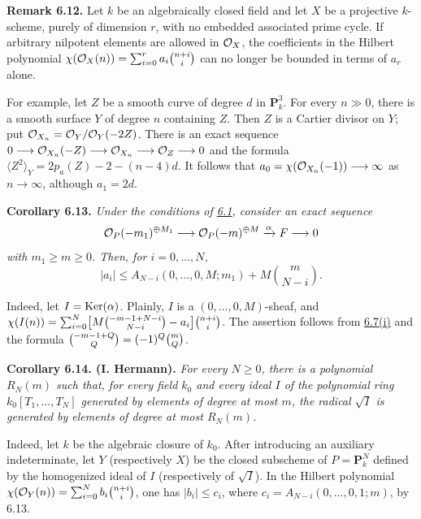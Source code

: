 \textbf{Remark 6.12.} Let $k$ be an algebraically closed field and let
$X$ be a projective $k$-scheme, purely of dimension $r$, with no embedded
associated prime cycle. If arbitrary nilpotent elements are allowed in
$\mathcal O_X$, the coefficients in the Hilbert polynomial
$\chi(\mathcal O_X(n))=\sum_{i=0}^{r}a_i\binom{n+i}{i}$ can no longer be bounded
in terms of $a_r$ alone.

For example, let $Z$ be a smooth curve of degree $d$ in $\mathbf P^3_k$.
For every $n\gg0$, there is a smooth surface $Y$ of degree $n$ containing
$Z$. Then $Z$ is a Cartier divisor on $Y$; put
$\mathcal O_{X_n}=\mathcal O_Y/\mathcal O_Y(-2Z)$. There is an exact sequence
$0\longrightarrow\mathcal O_{X_n}(-Z)\longrightarrow
\mathcal O_{X_n}\longrightarrow\mathcal O_Z\longrightarrow0$ and the formula
$\langle Z^2\rangle_Y=2p_a(Z)-2-(n-4)d$. It follows that
$a_0=\chi(\mathcal O_{X_n}(-1))\longrightarrow\infty$ as $n\longrightarrow
\infty$, although $a_1=2d$.

\textbf{Corollary 6.13.} \emph{Under the conditions of \hyperlink{sga6.e13.para.6-1}{6.1}, consider an exact sequence
\[
  \mathcal O_P(-m_1)^{\oplus M_1}\longrightarrow
  \mathcal O_P(-m)^{\oplus M}\xrightarrow{\alpha}F\longrightarrow0
\]
with $m_1\geq m\geq0$. Then, for $i=0,\ldots,N$,
\[
  |a_i|\leq A_{N-i}(0,\ldots,0,M;m_1)
  +M\binom{m}{N-i}.
\]}

Indeed, let $I=\operatorname{Ker}(\alpha)$. Plainly, $I$ is a
$(0,\ldots,0,M)$-sheaf, and
$\chi(I(n))=\allowbreak\sum_{i=0}^{N}
\bigl[M\tbinom{-m-1+N-i}{N-i}-a_i\bigr]\allowbreak\tbinom{n+i}{i}$.
The assertion follows from \hyperlink{sga6.e13.thm.6-7}{6.7(i)} and the formula
$\tbinom{-m-1+Q}{Q}=(-1)^Q\tbinom{m}{Q}$.

\textbf{Corollary 6.14. (I. Hermann).} \emph{For every $N\geq0$, there
is a polynomial $R_N(m)$ such that, for every field $k_0$ and every ideal
$I$ of the polynomial ring $k_0[T_1,\ldots,T_N]$ generated by elements
of degree at most $m$, the radical $\sqrt I$ is generated by elements of
degree at most $R_N(m)$.}

Indeed, let $k$ be the algebraic closure of $k_0$. After introducing an
auxiliary indeterminate, let $Y$ (respectively $X$) be the closed
subscheme of $P=\mathbf P^N_k$ defined by the homogenized ideal of $I$
(respectively of $\sqrt I$). In the Hilbert polynomial
$\chi(\mathcal O_Y(n))=\sum_{i=0}^{N}b_i\binom{n+i}{i}$, one has
$|b_i|\leq c_i$, where $c_i=A_{N-i}(0,\ldots,0,1;m)$, by 6.13.

